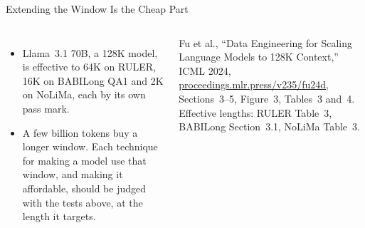 \begin{frame}{Extending the Window Is the Cheap Part}
\begin{columns}[T,onlytextwidth]
\begin{itemize}
        \item[\textcolor{red}{$\blacktriangleright$}] Llama~3.1 70B, a 128K model, is effective to 64K on RULER, 16K on BABILong QA1 and 2K on NoLiMa, each by its own pass mark.
        \item[\textcolor{red}{$\blacktriangleright$}] A few billion tokens buy a longer window. Each technique for making a model use that window, and making it affordable, should be judged with the tests above, at the length it targets.
      \end{itemize}
      \vspace{0.3em}
      {\scriptsize Fu et al., ``Data Engineering for Scaling Language Models to 128K Context,'' ICML 2024, \href{https://proceedings.mlr.press/v235/fu24d.html}{proceedings.mlr.press/v235/fu24d}, Sections~3--5, Figure~3, Tables~3 and~4. Effective lengths: RULER Table~3, BABILong Section~3.1, NoLiMa Table~3.\par}
  \end{columns}
\end{frame}
